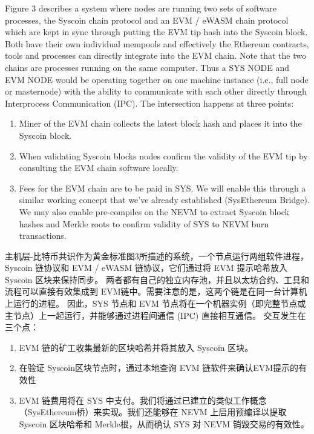 \documentclass{ctexart}
\begin{document}
Figure 3 describes a system where nodes are running two sets of software processes, the Syscoin chain protocol and an EVM / eWASM chain protocol which are kept in sync through putting the EVM tip hash into the Syscoin block. Both have their own individual mempools and effectively the Ethereum contracts, tools and processes can directly integrate into the EVM chain. Note that the two chains are processes running on the same computer. Thus a SYS NODE and EVM NODE would be operating together on one machine instance (i.e., full node or masternode) with the ability to communicate with each other directly through Interprocess Communication (IPC). The intersection happens at three points:


\begin{enumerate}
\item Miner of the EVM chain collects the latest block hash and places it into the Syscoin block.
\item When validating Syscoin blocks nodes confirm the validity of the EVM tip by consulting the EVM chain software locally.
\item Fees for the EVM chain are to be paid in SYS. We will enable this through a similar working concept that we’ve already established (SysEthereum Bridge). We may also enable pre-compiles on the NEVM to extract Syscoin block hashes and Merkle roots to confirm validity of SYS to NEVM burn transactions.
\end{enumerate}

主机层-比特币共识作为黄金标准图3所描述的系统，一个节点运行两组软件进程，Syscoin 链协议和 EVM / eWASM 链协议，它们通过将 EVM 提示哈希放入 Syscoin 区块来保持同步。 两者都有自己的独立内存池，并且以太坊合约、工具和流程可以直接有效集成到 EVM链中。需要注意的是，这两个链是在同一台计算机上运行的进程。 因此，SYS 节点和 EVM 节点将在一个机器实例（即完整节点或主节点）上一起运行，并能够通过进程间通信 (IPC) 直接相互通信。 交互发生在三个点：

\begin{enumerate}
\item EVM 链的矿工收集最新的区块哈希并将其放入 Syscoin 区块。
\item 在验证 Syscoin区块节点时，通过本地查询 EVM 链软件来确认EVM提示的有效性
\item EVM 链费用将在 SYS 中支付。我们将通过已建立的类似工作概念（SysEthereum桥）来实现。我们还能够在 NEVM 上启用预编译以提取 Syscoin 区块哈希和 Merkle根，从而确认 SYS 对 NEVM 销毁交易的有效性。
\end{enumerate}
\end{document}
